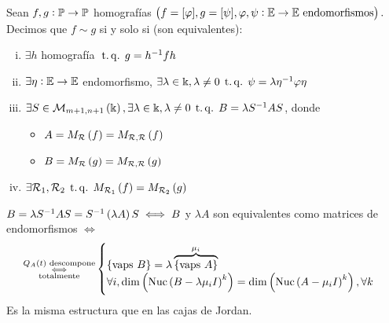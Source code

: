 \begin{defi}
    Sean $f, g : \mathbb{P} \to \mathbb{P}$ homografías $\left( f = [\varphi], g = [\psi], \varphi, \psi : \mathbb{E} \to \mathbb{E} \text{ endomorfismos}\right).$ Decimos que $f \sim g$ si y solo si (son equivalentes):
    \begin{enumerate}[(i)]
        \item $\exists h$ homografía $\operatorname{\;t.q.\;} g = h^{-1}fh$
        \item $\exists \eta : \mathbb{E} \to \mathbb{E}$ endomorfismo, $\exists \lambda \in \Bbbk, \lambda \neq 0 \operatorname{\;t.q.\;} \psi = \lambda \eta^{-1} \varphi \eta$
        \item $\exists S \in \mathcal{M}_{m+1, n+1}\left(\Bbbk\right), \exists \lambda\in\Bbbk, \lambda \neq 0 \operatorname{\;t.q.\;} B = \lambda S^{-1} A S$, donde
        \begin{itemize}
            \item $A = M_{\mathcal{R}}\left( f\right) = M_{\mathcal{R}, \mathcal{R}}\left( f\right)$
            \item $B = M_{\mathcal{R}}\left( g\right) = M_{\mathcal{R},\mathcal{R}}\left( g\right)$
        \end{itemize}
        \item $\exists \mathcal{R}_1,\mathcal{R}_2\operatorname{\;t.q.\;} M_{\mathcal{R}_1}\left( f\right) = M_{\mathcal{R}_2} \left( g\right)$
    \end{enumerate}
\end{defi}
\begin{obs}
    $B = \lambda S^{-1} A S = S^{-1} \left( \lambda A \right) S \iff B$ y $\lambda A$ son equivalentes como matrices de endomorfismos $\iff$
    \[
        \substack{Q_A\left( t \right) \text{ descompone} \\ \iff \\ \text{totalmente}}
        \begin{cases}
            \{ \text{vaps } B \} = \lambda \overbrace{\{ \text{vaps } A \}}^{\mu_i} \\
            \forall i, \dim \left( \text{Nuc}\left( B - \lambda \mu_i I\right)^k \right) = \dim \left(\text{Nuc}\left( A - \mu_i I \right) ^k \right), \forall k
        \end{cases}
    \]
    Es la misma estructura que en las cajas de Jordan.
\end{obs}
